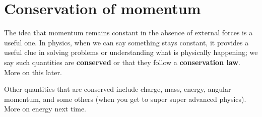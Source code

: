 \documentclass[handout]{tufte-handout}
\begin{document}
\section{Conservation of momentum}
The idea that momentum remains constant in the absence of external forces is a useful one. In physics, when we can say something stays constant, it provides a useful clue in solving problems or understanding what is physically happening; we say such quantities are \textbf{conserved} or that they follow a \textbf{conservation law}. More on this later. 

Other quantities that are conserved  include charge, mass, energy, angular momentum, and some others (when you get to super super advanced physics). More on energy next time. 
\end{document}
